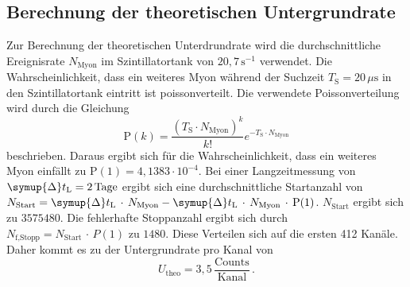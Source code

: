 \subsection{Berechnung der theoretischen Untergrundrate}
Zur Berechnung der theoretischen Unterdrundrate wird die durchschnittliche Ereignisrate $N_{\text{Myon}}$ im Szintillatortank von 
$20,7\,\unit{\second}^{-1}$ verwendet. Die Wahrscheinlichkeit, dass ein weiteres Myon während der Suchzeit $T_{\text{S}} = 20 \,\unit{\mu\second}$
in den Szintillatortank eintritt ist poissonverteilt. Die verwendete Poissonverteilung wird durch die Gleichung 
\begin{equation}
	\text{P}(k) = \frac{(T_{\text{S}} \cdot N_{\text{Myon}})^k}{k!} e^{- T_{\text{S}} \cdot N_{\text{Myon}}}
	\label{eqn:Poisson}
\end{equation}
beschrieben. Daraus ergibt sich für die Wahrscheinlichkeit, dass ein weiteres Myon einfällt zu $\text{P}(1) = 4,1383 \cdot 10^{-4}$.
Bei einer Langzeitmessung von $\symup{\Delta} t_{\text{L}} = 2 \, \text{Tage} $ ergibt sich eine durchschnittliche Startanzahl von 
$N_{\text{Start}} = \symup{\Delta} t_{\text{L}} \,\cdot \, N_{\text{Myon}} - \symup{\Delta} t_{\text{L}} \, \cdot \, N_{\text{Myon}} \, \cdot \, \text{P}(1)$. 
$N_{\text{Start}}$ ergibt sich zu $3575480$. Die fehlerhafte Stoppanzahl ergibt sich durch 
$N_{\text{f,Stopp}} = N_{\text{Start}} \, \cdot \, P(1)$ zu $1480$. Diese Verteilen sich auf die ersten 412 Kanäle. Daher kommt es 
zu der Untergrundrate pro Kanal von $$U_{\text{theo}} = 3,5 \, \frac{\text{Counts}}{\text{Kanal}}\,.$$


